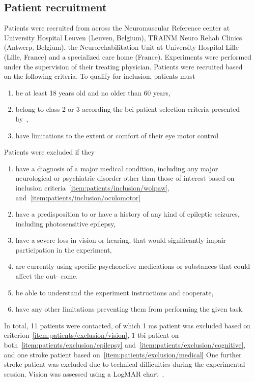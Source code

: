 \subsection{Patient recruitment}
Patients were recruited from across the Neuromuscular Reference center at
University Hospital Leuven (Leuven, Belgium), TRAINM Neuro Rehab Clinics
(Antwerp, Belgium), the Neurorehabilitation Unit at University Hospital Lille
(Lille, France) and a specialized care home (France).
Experiments were performed under the supervision of their treating physician.
Patients were recruited based on the following criteria.
To qualify for inclusion, patients must
\begin{enumerate}
	\item be at least 18 years old and no older than 60
	years,
  \item belong to class 2 or 3 according the \ac{bci}	patient selection criteria
    presented by~\textcite{Wolpaw2006},\label{item:patients/inclusion/wolpaw}
  \item have limitations to the extent or comfort of their eye motor control\label{item:patients/inclusion/oculomotor}
\end{enumerate}
Patients were excluded if they
\begin{enumerate}
  \item have a diagnosis of a major medical condition, including any major
    neurological or psychiatric disorder other than those of interest based on
    inclusion criteria~\ref{item:patients/inclusion/wolpaw},
    and~\ref{item:patients/inclusion/oculomotor}\label{item:patients/exclusion/medical}
  \item have a predisposition to or have a history of any kind of epileptic seizures,
    including photosensitive epilepsy,\label{item:patients/exclusion/epilepsy}
  \item have a severe loss in vision or hearing, that would significantly impair
        participation in the experiment,\label{item:patients/exclusion/vision}
  \item are currently using specific psychoactive medications or substances that could affect the out-
        come.\label{item:patients/exclusion/cognitive}
  \item be able to understand the experiment instructions and cooperate,
  \item have any other limitations preventing them from performing the given task.
\end{enumerate}

In total, 11 patients were contacted, of which 1 \ac{ms} patient was excluded based on
criterion~\ref{item:patients/exclusion/vision}, 1 \ac{tbi} patient on
both~\ref{item:patients/exclusion/epilepsy}
and~\ref{item:patients/exclusion/cognitive}, and one stroke patient based
on~\ref{item:patients/exclusion/medical}
One further stroke patient was excluded due to technical
difficulties during the experimental session.
Vision was assessed using a LogMAR chart~\cite{Bailey1976}.

